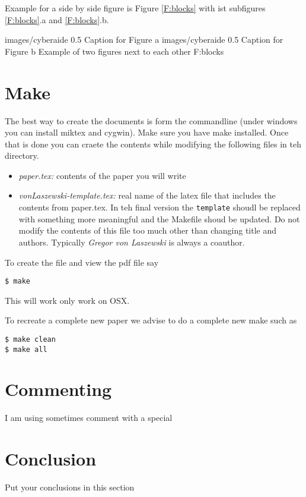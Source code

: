 Example for a side by side figure is Figure  \ref{F:blocks} with ist subfigures 
\ref{F:blocks}.a and \ref{F:blocks}.b.

  {images/cyberaide}
  {0.5}
  {Caption for Figure a}
  {images/cyberaide}
  {0.5}
  {Caption for Figure b}
  {Example of two figures next to each other}
  {F:blocks}


\section{Make}

The best way to create the documents is form the commandline (under windows you can install miktex and cygwin). Make sure you have make installed. Once that is done you can craete the contents while modifying the following files in teh directory.

\begin{itemize}

\item {\em paper.tex:} contents of the paper you will write
\item {\em vonLaszewski-template.tex:} real name of the latex file that includes the contents from paper.tex. In teh final version the \verb|template| shoudl be replaced with something more meaningful and the Makefile shoud be updated. Do not modify the contents of this file too much other than changing title and authors. Typically {\em Gregor von Laszewski} is always a coauthor.

\end{itemize}

To create the file and view the pdf file say

\begin{verbatim}
$ make
\end{verbatim}

This will work only work on OSX.

To recreate a complete new paper we advise to do a complete new make such as 

\begin{verbatim}
$ make clean
$ make all
\end{verbatim}



\section{Commenting}

I am using sometimes comment with a special 
 

\section{Conclusion}

Put your conclusions in this section